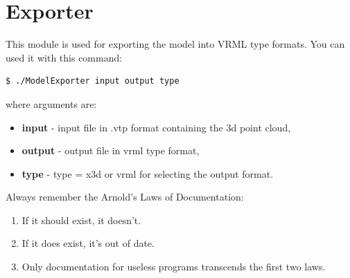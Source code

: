 \documentclass[11pt]{article} %
\begin{document}
\section{Exporter}

This module is used for exporting the model into VRML type formats. You can used it with this command:

\begin{verbatim}
$ ./ModelExporter input output type
\end{verbatim}

where arguments are:
\begin{itemize}

\item \textbf{input} - input file in .vtp format containing the 3d point cloud,
\item \textbf{output} - output file in vrml type format,
\item \textbf{type} - type = x3d or vrml for selecting the output format.
\end{itemize}

\newpage

Always remember the Arnold's Laws of Documentation:
\begin{enumerate}

\item If it should exist, it doesn't.
\item If it does exist, it's out of date.
\item Only documentation for useless programs transcends the first two laws.
    
\end{enumerate}


\newpage


 

\end{document}
